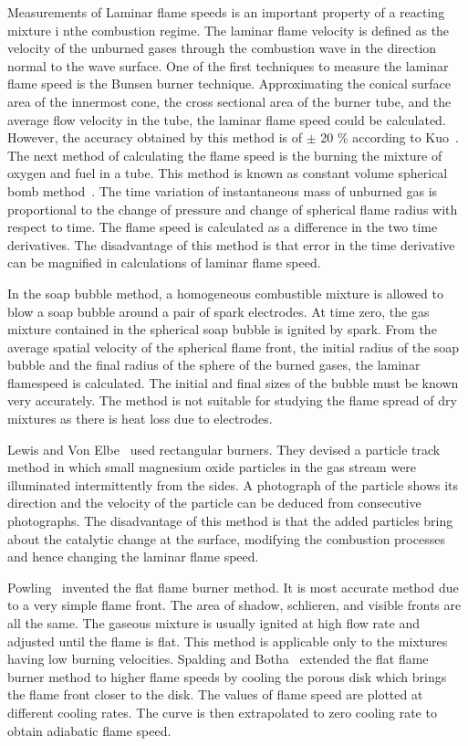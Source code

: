 Measurements of Laminar flame speeds is an important property of a
reacting mixture i nthe combustion regime. The laminar flame velocity is defined as the
velocity of the unburned gases through the combustion wave in the
direction normal to the wave surface. One of the first techniques to measure the laminar flame
speed is the Bunsen burner technique. Approximating the conical
surface area of the innermost cone, the cross sectional area of the
burner tube, and the average flow velocity in the tube, the laminar flame
speed could be calculated. However, the accuracy obtained by this
method is of $\pm $ 20 \% according to Kuo~\cite{Kuo}. The next method
of calculating the flame speed is the burning the mixture of oxygen
and fuel in a tube. This method is known as constant volume spherical
bomb method~\cite{Kuo}. The time variation of instantaneous mass of
unburned gas is proportional to the change of pressure and change of
spherical flame radius with respect to time. The flame speed is
calculated as a difference in the two time derivatives. The
disadvantage of this method is that error in the time derivative can be
magnified in calculations of laminar flame speed.

 In the soap bubble method, a homogeneous combustible mixture is
allowed to blow a soap bubble around a pair of spark electrodes. At
time zero, the gas mixture contained in the spherical soap bubble is
ignited by spark. From the average spatial velocity of the spherical
flame front, the initial radius of the soap bubble and the final
radius of the sphere of the burned gases, the laminar flamespeed is
calculated. The initial and final sizes of the bubble must be known
very accurately. The method is not suitable for studying the flame
spread of dry mixtures as there is heat loss due to electrodes.

 Lewis and Von Elbe~\cite{lewis} used rectangular
burners. They devised a particle track method in which small magnesium
oxide particles in the gas stream were illuminated intermittently from the
sides. A photograph of the particle shows its direction and the
velocity of the particle can be deduced from consecutive
photographs. The disadvantage of this method is that the added
particles bring about the catalytic change at the surface, modifying the combustion
processes and hence changing the laminar flame speed.

 Powling~\cite{powling} invented the flat flame burner
method. It is most accurate method due to a very simple flame
front. The area of shadow, schlieren, and visible fronts are all the
same. The gaseous mixture is usually ignited at high flow rate and
adjusted until the flame is flat. This method is applicable only to
the mixtures having low burning velocities. Spalding and
Botha~\cite{spalding} extended the flat flame burner method to higher flame
speeds by cooling the porous disk which brings the flame front closer to
the disk. The values of flame speed are plotted at different cooling
rates. The curve is then extrapolated to zero cooling rate to obtain
adiabatic flame speed.

